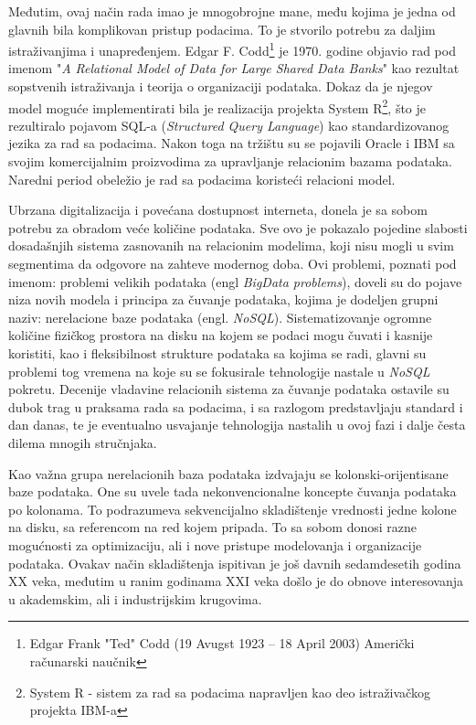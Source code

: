 \documentclass[12pt,oneside]{memoir}
\begin{document}
Međutim, ovaj način rada imao je mnogobrojne mane, među kojima je jedna od glavnih bila komplikovan pristup podacima. To je stvorilo potrebu za daljim istraživanjima i unapređenjem.  Edgar F. Codd\footnote{Edgar Frank "Ted" Codd (19 Avugst 1923 – 18 April 2003) Američki računarski naučnik }  je 1970. godine objavio rad pod imenom "\textit{A Relational Model of Data for Large Shared Data Banks}" kao rezultat sopstvenih istraživanja i teorija o organizaciji podataka. Dokaz da je njegov model moguće implementirati bila je realizacija projekta System R\footnote{System R - sistem za rad sa podacima napravljen kao deo istraživačkog projekta IBM-a}, što je rezultiralo pojavom SQL-a (\textit{Structured Query Language}) kao standardizovanog jezika za rad sa podacima. Nakon toga na tržištu su se pojavili Oracle i IBM sa svojim komercijalnim proizvodima za upravljanje relacionim bazama podataka. Naredni period obeležio je rad sa podacima koristeći relacioni model.  

Ubrzana digitalizacija i povećana dostupnost interneta, donela je sa sobom potrebu za obradom veće količine podataka. Sve ovo je pokazalo pojedine slabosti dosadašnjih sistema zasnovanih na relacionim modelima, koji nisu mogli u svim segmentima da odgovore na zahteve modernog doba. Ovi problemi, poznati pod imenom: problemi velikih podataka (engl \textit{BigData problems}), doveli su do pojave niza novih modela i principa za čuvanje podataka, kojima je dodeljen  grupni naziv: nerelacione baze podataka (engl. \textit{NoSQL}).
Sistematizovanje ogromne količine fizičkog prostora na disku na kojem se podaci mogu čuvati i kasnije koristiti, kao i fleksibilnost strukture podataka sa kojima se radi, glavni su problemi tog vremena na koje su se fokusirale tehnologije nastale u \textit{NoSQL} pokretu.
Decenije vladavine  relacionih sistema za čuvanje podataka ostavile su dubok trag u praksama rada sa podacima, i sa razlogom predstavljaju standard i dan danas, te je eventualno usvajanje tehnologija nastalih u ovoj fazi i dalje  česta dilema mnogih stručnjaka. 

Kao važna grupa nerelacionih baza podataka izdvajaju se kolonski-orijentisane baze podataka. One su uvele tada nekonvencionalne koncepte čuvanja podataka po kolonama. To podrazumeva sekvencijalno skladištenje vrednosti jedne kolone na disku, sa referencom na red kojem pripada. To sa sobom donosi razne mogućnosti za optimizaciju, ali i nove pristupe modelovanja i organizacije podataka. Ovakav način skladištenja ispitivan je još davnih sedamdesetih godina XX veka, međutim u ranim godinama XXI veka došlo je do obnove interesovanja u akademskim,  ali i industrijskim krugovima. 
\end{document}
